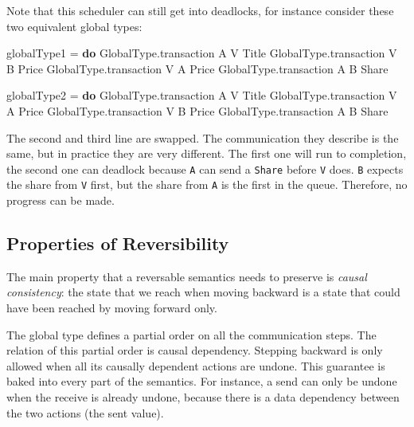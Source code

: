 \documentclass[runningheads,plain]{llncs}
\newenvironment{Shaded}{}{}
\newcommand{\KeywordTok}[1]{\textcolor[rgb]{0.00,0.44,0.13}{\textbf{#1}}}
\newcommand{\DataTypeTok}[1]{\textcolor[rgb]{0.56,0.13,0.00}{#1}}
\newcommand{\FunctionTok}[1]{\textcolor[rgb]{0.02,0.16,0.49}{#1}}
\newcommand{\NormalTok}[1]{#1}
\begin{document}
Note that this scheduler can still get into deadlocks, for instance
consider these two equivalent global types:

\begin{Shaded}
\begin{Highlighting}[]
\NormalTok{globalType1 }\FunctionTok{=} \KeywordTok{do} 
\NormalTok{    GlobalType.transaction }\DataTypeTok{A} \DataTypeTok{V} \DataTypeTok{Title} 
\NormalTok{    GlobalType.transaction }\DataTypeTok{V} \DataTypeTok{B} \DataTypeTok{Price} 
\NormalTok{    GlobalType.transaction }\DataTypeTok{V} \DataTypeTok{A} \DataTypeTok{Price} 
\NormalTok{    GlobalType.transaction }\DataTypeTok{A} \DataTypeTok{B} \DataTypeTok{Share} 

\NormalTok{globalType2 }\FunctionTok{=} \KeywordTok{do} 
\NormalTok{    GlobalType.transaction }\DataTypeTok{A} \DataTypeTok{V} \DataTypeTok{Title} 
\NormalTok{    GlobalType.transaction }\DataTypeTok{V} \DataTypeTok{A} \DataTypeTok{Price} 
\NormalTok{    GlobalType.transaction }\DataTypeTok{V} \DataTypeTok{B} \DataTypeTok{Price} 
\NormalTok{    GlobalType.transaction }\DataTypeTok{A} \DataTypeTok{B} \DataTypeTok{Share} 
\end{Highlighting}
\end{Shaded}

The second and third line are swapped. The communication they describe
is the same, but in practice they are very different. The first one will
run to completion, the second one can deadlock because \texttt{A} can
send a \texttt{Share} before \texttt{V} does. \texttt{B} expects the
share from \texttt{V} first, but the share from \texttt{A} is the first
in the queue. Therefore, no progress can be made.

\subsection{Properties of
Reversibility}\label{properties-of-reversibility}

The main property that a reversable semantics needs to preserve is
\emph{causal consistency}: the state that we reach when moving backward
is a state that could have been reached by moving forward only.

The global type defines a partial order on all the communication steps.
The relation of this partial order is causal dependency. Stepping
backward is only allowed when all its causally dependent actions are
undone. This guarantee is baked into every part of the semantics. For
instance, a send can only be undone when the receive is already undone,
because there is a data dependency between the two actions (the sent
value).
\end{document}
